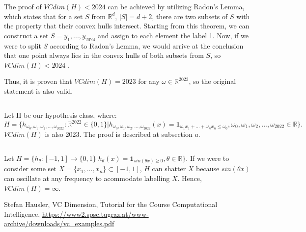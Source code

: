 \documentclass{article}
\newcounter{theorem}
\begin{document}
The proof of $VCdim(H) < 2024$ can be achieved by utilizing Radon's Lemma, which states that for a set $S$ from $\mathbb{R}^d$, $|S|=d+2$, there are two subsets of $S$ with the property that their convex hulls intersect. Starting from this theorem, we can construct a set $S={y_1,...,y_2024}$ and assign to each element the label 1. Now, if we were to split $S$ according to Radon's Lemma, we would arrive at the conclusion that one point always lies in the convex hulls of both subsets from $S$, so $VCdim(H) < 2024$ \cite{vcdim2023}.

Thus, it is proven that $VCdim(H)=2023$ for any $\omega\in\mathbb{R}^{2023}$, so the original statement is also valid.
\subsection{}
Let H be our hypothesis class, where:
$
H=\{h_{\omega_0, \omega_1,\omega_2,...,\omega_{2022}}:\mathbb{R}^{2022}\in\{0,1\}|h_{\omega_0, \omega_1,\omega_2,...,\omega_{2022}}(x) = \mathbf{1}_{\omega_1x_1 + ... + \omega_nx_n \leq \omega_0}, \omega_0, \omega_1,\omega_2,...,\omega_{2022}\in \mathbb{R}\}.
$
$VCdim(H)$ is also 2023. The proof is described at subsection $a$.
\subsection{}
Let $H=\{ h_\theta:[-1,1]\rightarrow\{0,1\}|h_\theta(x)=\mathbf{1}_{sin(\theta x) \geq 0}, \theta \in \mathbb{R}\}$. If we were to consider some set $X=\{x_1,...,x_n\}\subset[-1,1]$, $H$ can shatter $X$ because $sin(\theta x)$ can oscillate at any frequency to acommodate labelling $X$. Hence, $VCdim(H)=\infty$. 

\newpage

\begin{thebibliography}{1.7} 
	 \color{cyan}Stefan Hausler, VC Dimension, Tutorial for the Course Computational Intelligence, \url{https://www2.spsc.tugraz.at/www-archive/downloads/vc_examples.pdf} \color{black}
	
\end{thebibliography}
\end{document}
